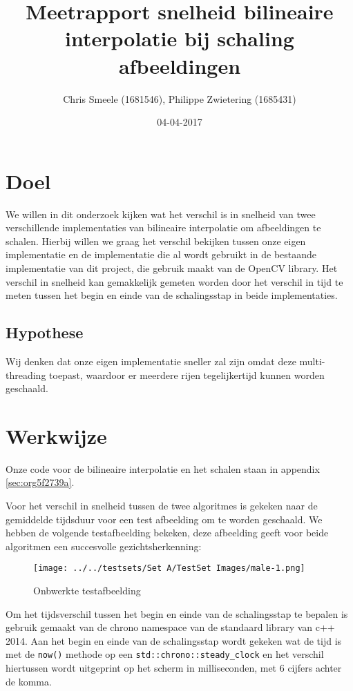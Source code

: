 \documentclass[a4paper]{article}
\author{Chris Smeele (1681546), Philippe Zwietering (1685431)}
\date{04-04-2017}
\title{Meetrapport snelheid bilineaire interpolatie bij schaling afbeeldingen}
\begin{document}
\maketitle
\setcounter{tocdepth}{2}
\tableofcontents


\section{Doel}
\label{sec:orgf30d1d2}
We willen in dit onderzoek kijken wat het verschil is in snelheid van twee verschillende implementaties van bilineaire interpolatie om afbeeldingen te schalen. Hierbij willen we graag het verschil bekijken tussen onze eigen implementatie en de implementatie die al wordt gebruikt in de bestaande implementatie van dit project, die gebruik maakt van de OpenCV library. Het verschil in snelheid kan gemakkelijk gemeten worden door het verschil in tijd te meten tussen het begin en einde van de schalingsstap in beide implementaties.

\subsection{Hypothese}
\label{sec:org67f792e}
Wij denken dat onze eigen implementatie sneller zal zijn omdat deze multi-threading toepast, waardoor er meerdere rijen tegelijkertijd kunnen worden geschaald.

\section{Werkwijze}
\label{sec:orgd5b8c4e}
Onze code voor de bilineaire interpolatie en het schalen staan in appendix \ref{sec:org5f2739a}.

Voor het verschil in snelheid tussen de twee algoritmes is gekeken naar de gemiddelde tijdsduur voor een test afbeelding om te worden geschaald. We hebben de volgende testafbeelding bekeken, deze afbeelding geeft voor beide algoritmen een succesvolle gezichtsherkenning: 

\begin{figure}[htbp]
\centering
\texttt{[image: ../../testsets/Set A/TestSet Images/male-1.png]}
\caption{\label{fig:org3373e27}
Onbwerkte testafbeelding}
\end{figure}

Om het tijdsverschil tussen het begin en einde van de schalingsstap te bepalen is gebruik gemaakt van de chrono namespace van de standaard library van c++ 2014. Aan het begin en einde van de schalingsstap wordt gekeken wat de tijd is met de \texttt{now()} methode op een \texttt{std::chrono::steady\_clock} en het verschil hiertussen wordt uitgeprint op het scherm in milliseconden, met 6 cijfers achter de komma.
\end{document}

